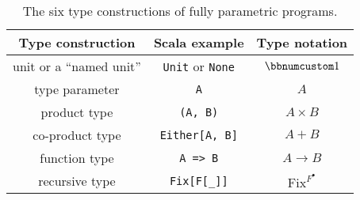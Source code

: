 \begin{wraptable}{l}{0.56\columnwidth}%
\begin{centering}
\vspace{-0.2\baselineskip}
\begin{tabular}{|c|c|c|}
\hline 
\textbf{\small{}Type construction} & \textbf{\small{}Scala example} & \textbf{\small{}Type notation}\tabularnewline
\hline 
\hline 
{\small{}unit or a \textsf{``}named unit\textsf{''}} & {\small{}}\lstinline!Unit!{\small{} or }\lstinline!None!{\small{} } & {\small{}$\bbnum 1$}\tabularnewline
\hline 
{\small{}type parameter} & {\small{}}\lstinline!A! & {\small{}$A$}\tabularnewline
\hline 
{\small{}product type} & {\small{}}\lstinline!(A, B)! & {\small{}$A\times B$}\tabularnewline
\hline 
{\small{}co-product type} & {\small{}}\lstinline!Either[A, B]! & {\small{}$A+B$}\tabularnewline
\hline 
{\small{}function type} & {\small{}}\lstinline!A => B! & {\small{}$A\rightarrow B$}\tabularnewline
\hline 
{\small{}recursive type} & {\small{}}\lstinline!Fix[F[_]]! & {\small{}$\text{Fix}^{F^{\bullet}}$}\tabularnewline
\hline 
\end{tabular}
\par\end{centering}
\caption{The six type constructions
of fully parametric programs.\label{tab:six-pure-type-constructions}}
\vspace{-0.2\baselineskip}
\end{wraptable}%

